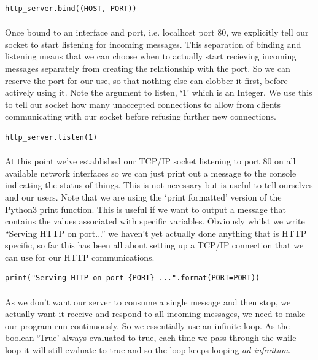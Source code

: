 \begin{lstlisting}[style=CODE]
http_server.bind((HOST, PORT))
\end{lstlisting}

\paragraph{} Once bound to an interface and port, i.e. localhost port 80, we explicitly tell our socket to start listening for incoming messages. This separation of binding and listening means that we can choose when to actually start recieving incoming messages separately from creating the relationship with the port. So we can reserve the port for our use, so that nothing else can clobber it first, before actively using it. Note the argument to listen, `1' which is an Integer. We use this to tell our socket how many unaccepted connections to allow from clients communicating with our socket before refusing further new connections.

\begin{lstlisting}[style=CODE]
http_server.listen(1)
\end{lstlisting}

\paragraph{} At this point we've established our TCP/IP socket listening to port 80 on all available network interfaces so we can just print out a message to the console indicating the status of things. This is not necessary but is useful to tell ourselves and our users. Note that we are using the `print formatted' version of the Python3 print function. This is useful if we want to output a message that contains the values associated with specific variables. Obviously whilst we write ``Serving HTTP on port...'' we haven't yet actually done anything that is HTTP specific, so far this has been all about setting up a TCP/IP connection that we can use for our HTTP communications.

\begin{lstlisting}[style=CODE]
print("Serving HTTP on port {PORT} ...".format(PORT=PORT))
\end{lstlisting}

\paragraph{} As we don't want our server to consume a single message and then stop, we actually want it receive and respond to all incoming messages, we need to make our program run continuously. So we essentially use an infinite loop. As the boolean `True' always evaluated to true, each time we pass through the while loop it will still evaluate to true and so the loop keeps looping \emph{ad infinitum}.

